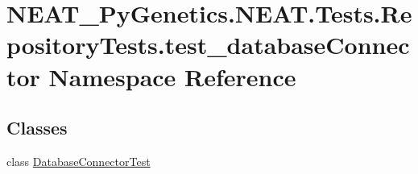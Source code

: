 \hypertarget{namespaceNEAT__PyGenetics_1_1NEAT_1_1Tests_1_1RepositoryTests_1_1test__databaseConnector}{}\section{N\+E\+A\+T\+\_\+\+Py\+Genetics.\+N\+E\+A\+T.\+Tests.\+Repository\+Tests.\+test\+\_\+database\+Connector Namespace Reference}
\label{namespaceNEAT__PyGenetics_1_1NEAT_1_1Tests_1_1RepositoryTests_1_1test__databaseConnector}
\subsection*{Classes}
\begin{DoxyCompactItemize}
\item 
class \hyperlink{classNEAT__PyGenetics_1_1NEAT_1_1Tests_1_1RepositoryTests_1_1test__databaseConnector_1_1DatabaseConnectorTest}{Database\+Connector\+Test}
\end{DoxyCompactItemize}
